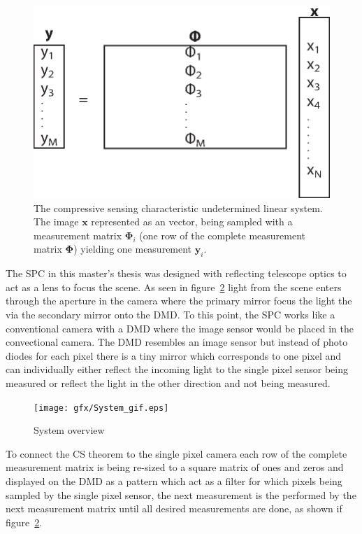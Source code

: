 \begin{figure}[H]
	\includegraphics[scale=0.5]{gfx/CS_eq.eps}
	\caption{The compressive sensing characteristic undetermined linear system. The image $\mathbf{x}$ represented as an vector, being sampled with a measurement matrix $\mathbf{\Phi}_i$ (one row of the complete measurement matrix $\mathbf{\Phi}$) yielding one measurement $\mathbf{y}_i$.}
	\label{fig:CS_eq_sys}
\end{figure}

The SPC in this master's thesis was designed with reflecting telescope optics to act as a lens to focus the scene. As seen in figure~\ref{fig:system_overview} light from the scene enters through the aperture in the camera where the primary mirror focus the light the via the secondary mirror onto the DMD. To this point, the SPC works like a conventional camera with a DMD where the image sensor would be placed in the convectional camera. The DMD resembles an image sensor but instead of photo diodes for each pixel there is a tiny mirror which corresponds to one pixel and can individually either reflect the incoming light to the single pixel sensor being measured or reflect the light in the other direction and not being measured.




\begin{figure}[H]
\texttt{[image: gfx/System\_gif.eps]}
	\caption{System overview}
	\label{fig:system_overview}
\end{figure}	

To connect the CS theorem to the single pixel camera each row of the complete measurement matrix is being re-sized to a square matrix of ones and zeros and displayed on the DMD as a pattern which act as a filter for which pixels being sampled by the single pixel sensor, the next measurement is the performed by the next measurement matrix until all desired measurements are done, as shown if figure~\ref{fig:system_overview}.\\[0.1in]

